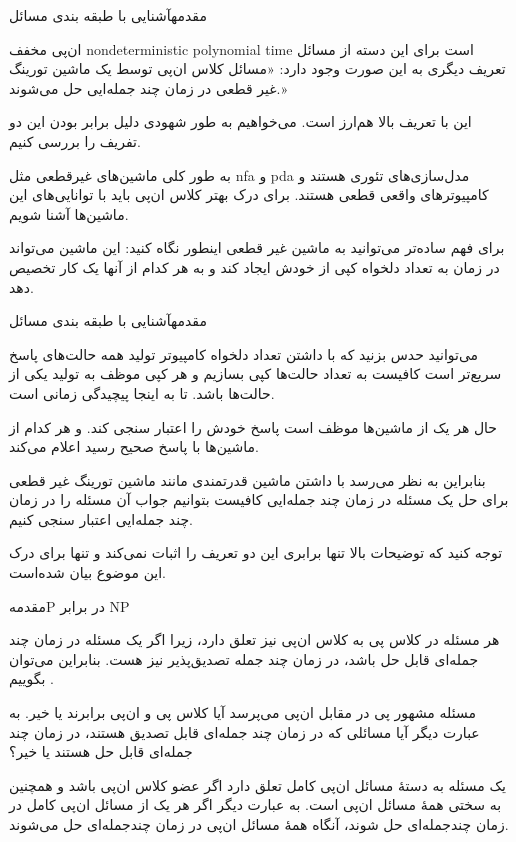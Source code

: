 \begin{itemframe-s}{مقدمه}{آشنایی با طبقه بندی مسائل}
\item[-]
ان‌پی مخفف
nondeterministic polynomial time
است برای این دسته از مسائل تعریف دیگری به این صورت وجود دارد: «مسائل کلاس ان‌پی توسط یک ماشین تورینگ غیر قطعی در زمان چند جمله‌ایی حل می‌شوند.»
\item[-]
این با تعریف بالا هم‌ارز است. می‌خواهیم به طور شهودی دلیل برابر بودن این دو تفریف را بررسی کنیم.

 به طور کلی ماشین‌های غیرقطعی مثل nfa و pda مدل‌سازی‌های تئوری هستند و کامپیوترهای واقعی قطعی هستند. برای درک بهتر کلاس ان‌پی باید با توانایی‌های این ماشین‌ها آشنا شویم.
\item[-]
برای فهم ساده‌تر می‌توانید به ماشین غیر قطعی اینطور نگاه کنید: این ماشین می‌تواند در زمان
به تعداد دلخواه کپی از خودش ایجاد کند و به هر کدام از آنها یک کار تخصیص دهد.
\end{itemframe-s}

\begin{itemframe-s}{مقدمه}{آشنایی با طبقه بندی مسائل}
\item[-]
می‌توانید حدس بزنید که با داشتن تعداد دلخواه کامپیوتر تولید همه حالت‌های پاسخ سریع‌تر است کافیست به تعداد حالت‌ها کپی بسازیم و هر کپی موظف به تولید یکی از حالت‌ها باشد. تا به اینجا پیچیدگی زمانی
است.
\item[-]
 حال هر یک از ماشین‌ها موظف است پاسخ خودش را اعتبار سنجی کند. و هر کدام از ماشین‌ها با پاسخ صحیح رسید اعلام می‌کند.
\item[-]
بنابراین به نظر می‌رسد با داشتن ماشین قدرتمندی مانند ماشین تورینگ غیر قطعی برای حل یک مسئله در زمان چند جمله‌ایی کافیست بتوانیم جواب آن مسئله را در زمان چند جمله‌ایی اعتبار سنجی کنیم.
\item[-]
توجه کنید که توضیحات بالا تنها برابری این دو تعریف را اثبات نمی‌کند و تنها برای درک این موضوع بیان شده‌است.
\end{itemframe-s}

\begin{itemframe-s}{مقدمه}{P در برابر NP}

\item[-]
هر مسئله در کلاس پی به کلاس ان‌پی نیز تعلق دارد، زیرا اگر یک مسئله در زمان چند جمله‌ای قابل حل باشد، در زمان چند جمله تصدیق‌پذیر نیز هست. بنابراین می‌توان بگوییم
.
\item[-]
مسئله مشهور پی در مقابل ان‌پی
می‌پرسد آیا کلاس پی و ان‌پی برابرند یا خیر. به عبارت دیگر آیا مسائلی که در زمان چند جمله‌ای قابل تصدیق هستند، در زمان چند جمله‌ای قابل حل هستند یا خیر؟
\item[-]
یک مسئله به دستهٔ مسائل ان‌پی کامل
تعلق دارد اگر عضو کلاس ان‌پی باشد و همچنین به سختی همهٔ مسائل ان‌پی است.
به عبارت دیگر اگر هر یک از مسائل ان‌پی کامل در زمان چند‌جمله‌ای حل شوند، آنگاه همهٔ مسائل ان‌پی در زمان چند‌جمله‌ای حل می‌شوند.
\end{itemframe-s}

